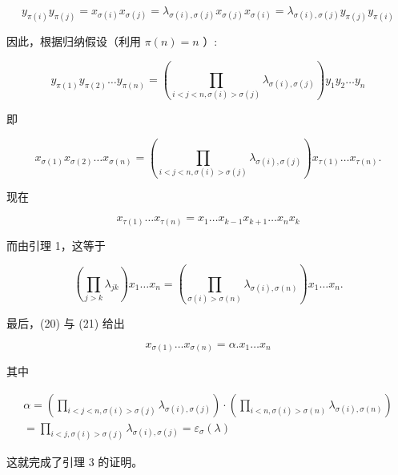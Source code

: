 \[
y _ {\pi (i)} y _ {\pi (j)} = x _ {\sigma (i)} x _ {\sigma (j)} = \lambda_ {\sigma (i), \sigma (j)} x _ {\sigma (j)} x _ {\sigma (i)} = \lambda_ {\sigma (i), \sigma (j)} y _ {\pi (j)} y _ {\pi (i)}
\]

因此，根据归纳假设（利用 \(\pi(n) = n\) ）:

\[
y _ {\pi (1)} y _ {\pi (2)} \dots y _ {\pi (n)} = \left(\prod_ {i <   j <   n, \sigma (i) > \sigma (j)} \lambda_ {\sigma (i), \sigma (j)}\right) y _ {1} y _ {2} \dots y _ {n}
\]

即

\[
x _ {\sigma (1)} x _ {\sigma (2)} \dots x _ {\sigma (n)} = \left(\prod_ {i <   j <   n, \sigma (i) > \sigma (j)} \lambda_ {\sigma (i), \sigma (j)}\right) x _ {\tau (1)} \dots x _ {\tau (n)}.\tag{20}
\]

现在

\[
x _ {\tau (1)} \dots x _ {\tau (n)} = x _ {1} \dots x _ {k - 1} x _ {k + 1} \dots x _ {n} x _ {k}
\]

而由引理 1，这等于

\[
\left(\prod_ {j > k} \lambda_ {j k}\right) x _ {1} \dots x _ {n} = \left(\prod_ {\sigma (i) > \sigma (n)} \lambda_ {\sigma (i), \sigma (n)}\right) x _ {1} \dots x _ {n}.\tag{21}
\]

最后，(20) 与 (21) 给出

\[
x _ {\sigma (1)} \dots x _ {\sigma (n)} = \alpha . x _ {1} \dots x _ {n}
\]

其中

\[
\begin{array}{l} \alpha = \left(\prod_ {i <   j <   n, \sigma (i) > \sigma (j)} \lambda_ {\sigma (i), \sigma (j)}\right) \cdot \left(\prod_ {i <   n, \sigma (i) > \sigma (n)} \lambda_ {\sigma (i), \sigma (n)}\right) \\ = \prod_ {i <   j, \sigma (i) > \sigma (j)} \lambda_ {\sigma (i), \sigma (j)} = \varepsilon_ {\sigma} (\lambda) \end{array}
\]

这就完成了引理 3 的证明。

